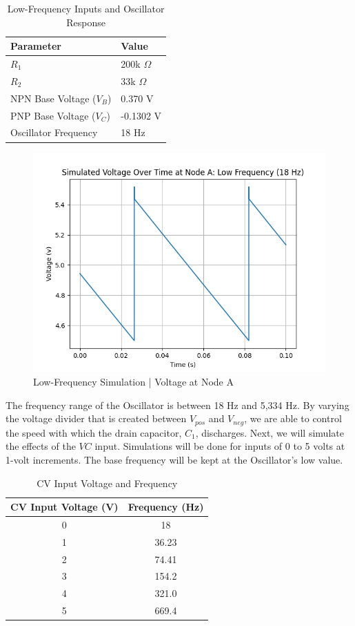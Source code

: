 \documentclass{article}
\begin{document}
\begin{table}[H]
  \centering
  \begin{tabular}{ll}
    \toprule
    Parameter & Value \\
    \midrule
    $R_1$ & 200k $\Omega$ \\
    $R_2$ & 33k $\Omega$ \\
    NPN Base Voltage ($V_B$) & 0.370 V \\
    PNP Base Voltage ($V_C$) & -0.1302 V \\
    Oscillator Frequency & 18 Hz \\
    \bottomrule
  \end{tabular}
  \caption{Low-Frequency Inputs and Oscillator Response}
\end{table}
\vspace{-1.5cm}
\begin{figure}[H]
  \centering
  \includegraphics[width=.7\linewidth]{png/Figure_2.png}
  \caption{Low-Frequency Simulation | Voltage at Node A}
\end{figure}


The frequency range of the Oscillator is between 18 Hz and 5,334 Hz. By varying the voltage divider that is created between $V_{pos}$ and $V_{neg}$, we are able to control the speed with which the drain capacitor, $C_1$, discharges. Next, we will simulate the effects of the $VC$ input. Simulations will be done for inputs of 0 to 5 volts at 1-volt increments. The base frequency will be kept at the Oscillator's low value.

\begin{table}[H]
  \centering
  \begin{tabular}{cc}
    \toprule
    \textbf{CV Input Voltage (V)} & \textbf{Frequency (Hz)} \\
    \midrule
    0 & 18 \\
    1 & 36.23 \\
    2 & 74.41 \\
    3 & 154.2 \\
    4 & 321.0 \\
    5 & 669.4 \\
    \bottomrule
  \end{tabular}
  \caption{CV Input Voltage and Frequency}
\end{table}
\end{document}
